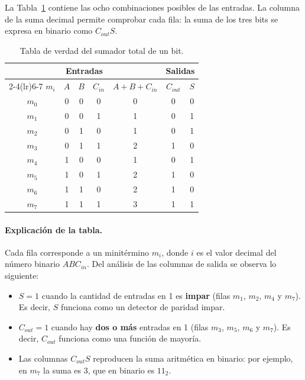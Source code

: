\documentclass[10pt]{article}
\begin{document}
La Tabla~\ref{tab:verdad} contiene las ocho combinaciones posibles de las
entradas. La columna de la suma decimal permite comprobar cada fila: la suma de
los tres bits se expresa en binario como $C_{out}S$.

\begin{table}[!htbp]
  \centering
  \caption{Tabla de verdad del sumador total de un bit.}
  \label{tab:verdad}
  \begin{tabular}{ccccccc}
    \toprule
    & \multicolumn{3}{c}{Entradas} & & \multicolumn{2}{c}{Salidas} \\
    \cmidrule(lr){2-4}\cmidrule(lr){6-7}
    $m_i$ & $A$ & $B$ & $C_{in}$ & $A+B+C_{in}$ & $C_{out}$ & $S$ \\
    \midrule
    $m_0$ & 0 & 0 & 0 & 0 & 0 & 0 \\
    $m_1$ & 0 & 0 & 1 & 1 & 0 & 1 \\
    $m_2$ & 0 & 1 & 0 & 1 & 0 & 1 \\
    $m_3$ & 0 & 1 & 1 & 2 & 1 & 0 \\
    $m_4$ & 1 & 0 & 0 & 1 & 0 & 1 \\
    $m_5$ & 1 & 0 & 1 & 2 & 1 & 0 \\
    $m_6$ & 1 & 1 & 0 & 2 & 1 & 0 \\
    $m_7$ & 1 & 1 & 1 & 3 & 1 & 1 \\
    \bottomrule
  \end{tabular}
\end{table}

\paragraph{Explicación de la tabla.} Cada fila corresponde a un minitérmino
$m_i$, donde $i$ es el valor decimal del número binario $ABC_{in}$. Del análisis
de las columnas de salida se observa lo siguiente:
\begin{itemize}
  \item $S = 1$ cuando la cantidad de entradas en 1 es \textbf{impar} (filas
        $m_1$, $m_2$, $m_4$ y $m_7$). Es decir, $S$ funciona como un detector de
        paridad impar.
  \item $C_{out} = 1$ cuando hay \textbf{dos o más} entradas en 1 (filas $m_3$,
        $m_5$, $m_6$ y $m_7$). Es decir, $C_{out}$ funciona como una función de
        mayoría.
  \item Las columnas $C_{out}S$ reproducen la suma aritmética en binario: por
        ejemplo, en $m_7$ la suma es $3$, que en binario es $11_2$.
\end{itemize}
\end{document}
